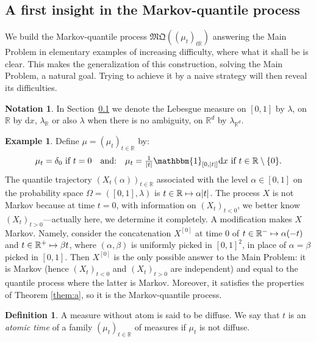 \documentclass[JEP,XML,SOM,Unicode,NoEqCountersInSection,NoFloatCountersInSection,published]{cedram}
\newcommand\mto{\mathchoice{\longmapsto}{\mapsto}{\mapsto}{\mapsto}}
\theoremstyle{plain}
\theoremstyle{definition}
\newtheorem{defi}[them]{Definition}
\newtheorem{notation}[them]{Notation} %
\newtheorem{ex}[them]{Example}
\newcommand{\dd}{\mathrm{d}}
\newcommand{\mq}{\mathfrak{MQ}}
\newcommand{\one}{\mathbbm{1}}
\newcommand{\la}{\lambda}
\newcommand{\R}{\mathbb{R}}
\begin{document}
\subsection{A first insight in the Markov-quantile process}\label{subsec:intro_quantilemarkovien}

We build the Markov-quantile process $\mq((\mu_t)_{t\R})$ answering the Main Problem in elementary examples of increasing difficulty, where what it shall be is clear. This makes the generalization of this construction, \ie solving the Main Problem, a natural goal. Trying to achieve it by a naive strategy will then reveal its difficulties.

\begin{notation}\label{not:leb}
In Section~\ref{subsec:intro_quantilemarkovien} we denote the Lebesgue measure on $[0,1]$ by $\la$, on~$\R$ by $\dd x$, $\la_\R$ or also $\la$ when there is no ambiguity, on $\R^d$ by $\la_{\R^d}$.
\end{notation}

\begin{ex}\label{ex1}Define $\mu=(\mu_t)_{t\in\R}$ by:
\[\textstyle\mu_t=\delta_0\ \text{if }t=0\quad \text{and:}\quad \mu_t=\frac{1}{|t|}\one_{[0,|t|]}\dd x\ \text{if }t\in \R\setminus \{0\}.\]
The quantile trajectory $(X_t(\alpha))_{t\in\R}$ associated with the level $\alpha\in [0,1]$ on the probability space $\Omega=([0,1],\la)$ is $t\in \R\mto \alpha|t|$. The process $X$ is not Markov because at time $t=0$, with information on $(X_t)_{t<0}$, we better know $(X_t)_{t>0}$---actually here, we determine it completely. A modification makes $X$ Markov. Namely, consider the concatenation $X^{[0]}$ at time $0$ of $t\in \R^-\mto\alpha(-t)$ and $t\in \R^+\mto\beta t$, where $(\alpha,\beta)$ is uniformly picked in $[0,1]^2$, in place of $\alpha=\beta$ picked in $[0,1]$. Then $X^{[0]}$ is the only possible answer to the Main Problem: it is Markov (hence $(X_t)_{t<0}$ and $(X_t)_{t>0}$ are independent) and equal to the quantile process where the latter is Markov. Moreover, it satisfies the properties of Theorem \ref{them:a}, so it is the Markov-quantile process.
\end{ex}

\begin{defi}\label{defi:atomic}A measure without atom is said to be diffuse. We say that $t$ is an \emph{atomic time} of a family $(\mu_t)_{t\in\R}$ of measures if $\mu_t$ is not diffuse.
\end{defi}
\end{document}
